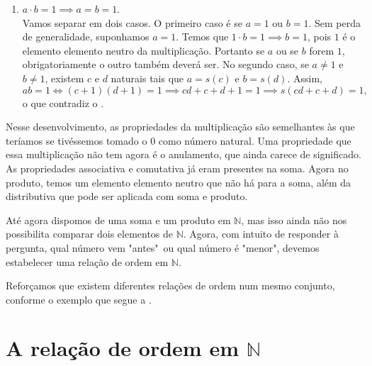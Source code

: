 \documentclass[../main.tex]{subfiles}
\begin{document}
\begin{dem}
\begin{enumerate}[label=(\roman*)]
        \item $a \cdot b = 1 \implies a = b = 1$. \\
            Vamos separar em dois casos. O primeiro caso é se $a=1$ ou $b=1$.
            Sem perda de generalidade, suponhamos $a = 1$. Temos que $1 \cdot b = 1 \implies b = 1$, pois $1$ é o elemento elemento neutro da multiplicação. Portanto se $a$ ou se $b$ forem $1$, obrigatoriamente o outro também deverá ser.
            No segundo caso, se $a \neq 1$ e $ b \neq 1$, existem $c$ e $d$ naturais tais que $a = s(c)$ e $b = s(d)$.
            Assim, 
            \[ ab=1 \iff (c+1) (d+1) = 1 \implies cd + c + d + 1 = 1 \implies s(cd + c + d) = 1, \] 
            o que contradiz o  .
    \end{enumerate}
\end{dem}

Nesse desenvolvimento, as propriedades da multiplicação são semelhantes às que teríamos se tivéssemos tomado o $0$ como número natural. Uma propriedade que essa multiplicação não tem agora é o anulamento, que ainda carece de significado. As propriedades associativa e comutativa já eram presentes na soma. Agora no produto, temos um elemento elemento neutro que não há para a soma, além da distributiva que pode ser aplicada com soma e produto.


Até agora dispomos de uma soma e um produto em $\mathbb{N}$, mas isso ainda não nos possibilita comparar dois elementos de $\mathbb{N}$. Agora, com intuito de responder à pergunta, qual número vem "antes"\ ou qual número é "menor", devemos estabelecer uma relação de ordem em $\mathbb{N}$. 

Reforçamos que existem diferentes relações de ordem num mesmo conjunto, conforme o exemplo que segue a .

\section{A relação de ordem em $\mathbb{N}$}
\end{document}
